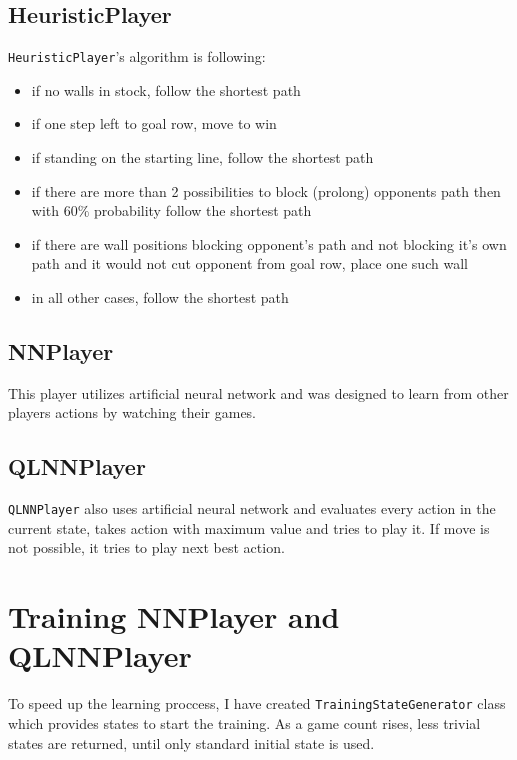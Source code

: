 \subsection{HeuristicPlayer}
{\lstinline{HeuristicPlayer}}'s algorithm is following:
\begin{itemize}
  \vspace*{-0.25cm}
  \setlength\itemsep{-0.15cm}

  \item if no walls in stock, follow the shortest path
  \item if one step left to goal row, move to win
  \item if standing on the starting line, follow the shortest path
  \item if there are more than 2 possibilities to block (prolong) opponents
        path then with $60\%$ probability follow the shortest path
  \item if there are wall positions blocking opponent's path and not
        blocking it's own path and it would not cut opponent from goal row,
        place one such wall
  \item in all other cases, follow the shortest path

  \vspace*{-0.25cm}
\end{itemize}

\subsection{NNPlayer}
This player utilizes artificial neural network and was designed to learn from
other players actions by watching their games.

\subsection{QLNNPlayer}
{\lstinline{QLNNPlayer}} also uses artificial neural network and
evaluates every action in the current state, takes action
with maximum value and tries to play it. If move is not possible, it tries to
play next best action.

\section{Training NNPlayer and QLNNPlayer}
To speed up the learning proccess, I have created
{\lstinline{TrainingStateGenerator}} class which provides states
to start the training. As a game count rises, less trivial states are
returned, until only standard initial state is used.

